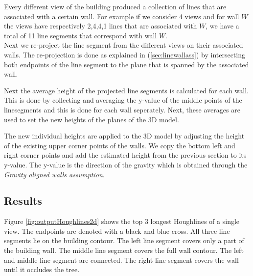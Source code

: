 	Every different view of the building produced a collection of lines that are
	associated with a certain wall. For example if we consider 4 views and for
	wall $W$ the views have respectively 2,4,4,1 lines that are associated with
	$W$, we have a total of 11 line segments that correspond with wall $W$.\\

	Next we re-project the line segment from the different views on their
	associated walls.  The re-projection is done as explained in
	(\ref{sec:linewallass}) by intersecting both endpoints
	of the line segment to the plane that is spanned by the associated wall.

	\clearpage

	Next the average height of the projected line segments is calculated for
	each wall. This is done by collecting and averaging the y-value of
	the middle points of the linesegments and this is done for each wall seperately.
	Next, these averages are
	used to set the new heights of the planes of the 3D model.  

	The new individual heights are applied to the 3D model by adjusting the
	height of the existing upper corner points of the walls. We copy the bottom
	left and right corner points and add the estimated height from the previous
	section to its y-value. The y-value is the direction of the gravity which is
	obtained through the \emph{Gravity aligned walls assumption}.\\

\newpage
\subsection{Results}
\label{sec:ResultImprove}
\clearpage
{}
\clearpage

Figure \ref{fig:outputHoughlines2d} shows the top 3 longest Houghlines of a
single view. The endpoints are denoted with a black and blue cross. All three line segments lie on the
building contour.  The left line segment covers only a part of the building wall. The
middle line segment covers the full wall contour. The left and middle line segment are connected. The
right line segment covers the wall until it occludes the tree.\\

